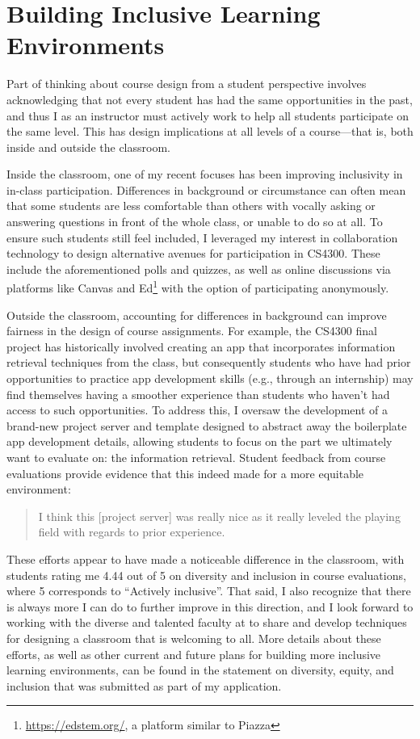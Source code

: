 \documentclass[12pt,letterpaper]{article}
\begin{document}
\section{Building Inclusive Learning Environments}
Part of thinking about course design from a student perspective involves acknowledging that not every student has had the same opportunities in the past, and thus I as an instructor must actively work to help all students participate on the same level.
This has design implications at all levels of a course---that is, both inside and outside the classroom.

Inside the classroom, one of my recent focuses has been improving inclusivity in in-class participation.
Differences in background or circumstance can often mean that some students are less comfortable than others with vocally asking or answering questions in front of the whole class, or unable to do so at all.
To ensure such students still feel included, I leveraged my interest in collaboration technology to design alternative avenues for participation in CS4300.
These include the aforementioned polls and quizzes, as well as online discussions via platforms like Canvas and Ed\footnote{\url{https://edstem.org/}, a platform similar to Piazza} with the option of participating anonymously.

Outside the classroom, accounting for differences in background can improve fairness in the design of course assignments.
For example, the CS4300 final project has historically involved creating an app that incorporates information retrieval techniques from the class, but consequently students who have had prior opportunities to practice app development skills (e.g., through an internship) may find themselves having a smoother experience than students who haven't had access to such opportunities.
To address this, I oversaw the development of a brand-new project server and template designed to abstract away the boilerplate app development details, allowing students to focus on the part we ultimately want to evaluate on: the information retrieval.
Student feedback from course evaluations provide evidence that this indeed made for a more equitable environment:
\begin{quote}
I think this [project server] was really nice as it really leveled the playing field with regards to prior experience.
\end{quote}

These efforts appear to have made a noticeable difference in the classroom, with students rating me 4.44 out of 5 on diversity and inclusion in course evaluations, where 5 corresponds to ``Actively inclusive''.
That said, I also recognize that there is always more I can do to further improve in this direction, and I look forward to working with the diverse and talented faculty at \schoolname to share and develop techniques for designing a classroom that is welcoming to all.
\iflongdei
More details about these efforts, as well as other current and future plans for building more inclusive learning environments, can be found in the statement on diversity, equity, and inclusion that was submitted as part of my application.
\else
%
\fi
\end{document}
